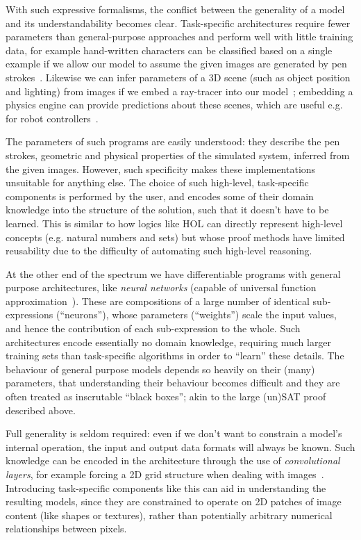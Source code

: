 \documentclass{article}
\begin{document}
With such expressive formalisms, the conflict between the generality of a model
and its understandability becomes clear. Task-specific architectures require
fewer parameters than general-purpose approaches and perform well with little
training data, for example hand-written characters can be classified based on a
single example if we allow our model to assume the given images are generated by
pen strokes~\cite{lake2015human}. Likewise we can infer parameters of a 3D scene
(such as object position and lighting) from images if we embed a ray-tracer into
our model~\cite{li2018differentiable}; embedding a physics engine can provide
predictions about these scenes, which are useful e.g. for robot
controllers~\cite{degrave2016differentiable}.

The parameters of such programs are easily understood: they describe the pen
strokes, geometric and physical properties of the simulated system, inferred
from the given images. However, such specificity makes these implementations
unsuitable for anything else. The choice of such high-level, task-specific
components is performed by the user, and encodes some of their domain knowledge
into the structure of the solution, such that it doesn't have to be learned.
This is similar to how logics like HOL can directly represent high-level
concepts (e.g. natural numbers and sets) but whose proof methods have limited
reusability due to the difficulty of automating such high-level reasoning.

At the other end of the spectrum we have differentiable programs with general
purpose architectures, like \emph{neural networks} (capable of universal
function approximation~\cite{funahashi1989approximate}). These are compositions
of a large number of identical sub-expressions (``neurons''), whose parameters
(``weights'') scale the input values, and hence the contribution of each
sub-expression to the whole. Such architectures encode essentially no domain
knowledge, requiring much larger training sets than task-specific algorithms in
order to ``learn'' these details.  The behaviour of general purpose models
depends so heavily on their (many) parameters, that understanding their
behaviour becomes difficult and they are often treated as inscrutable ``black
boxes''; akin to the large (un)SAT proof described above.

Full generality is seldom required: even if we don't want to constrain a model's
internal operation, the input and output data formats will always be known. Such
knowledge can be encoded in the architecture through the use of
\emph{convolutional layers}, for example forcing a 2D grid structure when
dealing with images~\cite{krizhevsky2012imagenet}. Introducing task-specific
components like this can aid in understanding the resulting models, since they
are constrained to operate on 2D patches of image content (like shapes or
textures), rather than potentially arbitrary numerical relationships between
pixels.
\end{document}
